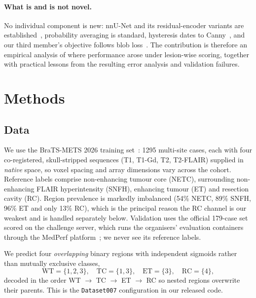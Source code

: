 \documentclass[runningheads]{llncs}
\begin{document}
\paragraph{What is and is not novel.} No individual component is new: nnU-Net and its
residual-encoder variants are established~\cite{isensee2021nnunet,isensee2024resenc}, probability
averaging is standard, hysteresis dates to Canny~\cite{canny1986}, and our third member's objective
follows blob loss~\cite{kofler2022blob,kundu2026instance}. The contribution is therefore an
empirical analysis of where performance arose under lesion-wise scoring, together with practical
lessons from the resulting error analysis and validation failures.

\section{Methods}
\label{sec:methods}

\subsection{Data}
\label{sec:data}

We use the BraTS-METS 2026 training set~\cite{bratsmet2025,brats2026}: 1295 multi-site cases, each with four co-registered,
skull-stripped sequences (T1, T1-Gd, T2, T2-FLAIR) supplied in \emph{native} space, so voxel
spacing and array dimensions vary across the cohort. Reference labels comprise non-enhancing
tumour core (NETC), surrounding non-enhancing FLAIR hyperintensity (SNFH), enhancing tumour (ET)
and resection cavity (RC). Region prevalence is markedly imbalanced (54\% NETC, 89\% SNFH,
96\% ET and only 13\% RC), which is the principal reason the RC channel is our weakest and is
handled separately below.
Validation uses the official 179-case set scored on the challenge
server, which runs the organisers' evaluation containers through the MedPerf
platform~\cite{medperf2023}; we never see its reference labels.

We predict four \emph{overlapping} binary regions with independent sigmoids rather than mutually
exclusive classes,
\[
\mathrm{WT}=\{1,2,3\},\quad \mathrm{TC}=\{1,3\},\quad \mathrm{ET}=\{3\},\quad \mathrm{RC}=\{4\},
\]
decoded in the order WT $\rightarrow$ TC $\rightarrow$ ET $\rightarrow$ RC so nested regions
overwrite their parents. This is the \texttt{Dataset007} configuration in our released code.
\end{document}
